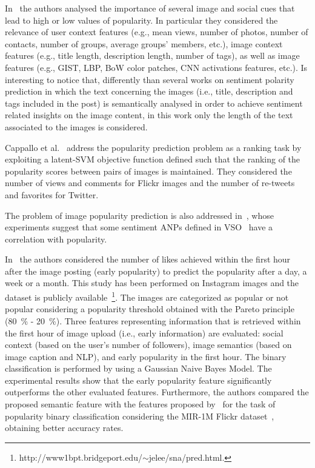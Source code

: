 In~\cite{khosla2014makes} the authors analysed the importance of several image and social cues that lead to high or low values of popularity. In particular they considered the relevance of user context features (e.g., mean views, number of photos, number of contacts, number of groups, average groups' members, etc.), image context features (e.g., title length, description length, number of tags), as well as image features (e.g., GIST, LBP, BoW color patches, CNN activations features, etc.). Is interesting to notice that, differently than several works on sentiment polarity prediction in which the text concerning the images (i.e., title, description and tags included in the post) is semantically analysed in order to achieve sentiment related insights on the image content, in this work only the length of the text associated to the images is considered. 

Cappallo et al.~\cite{cappallo2015latent} address the popularity prediction problem as a ranking task by exploiting a latent-SVM objective function defined such that the ranking of the popularity scores between pairs of images is maintained.
They considered the number of views and comments for Flickr images and the number of re-tweets and favorites for Twitter.

The problem of image popularity prediction is also addressed in~\cite{gelli2015image}, whose experiments suggest that some sentiment ANPs defined in VSO~\cite{borth2013large} have a correlation with popularity.

In~\cite{almgren2016predicting} the authors considered the number of likes achieved within the first hour after the image posting (early popularity) to predict the popularity after a day, a week or a month. This study has been performed on Instagram images and the dataset is publicly available~\footnote{http://www1bpt.bridgeport.edu/$\sim$jelee/sna/pred.html.}. The images are categorized as popular or not popular considering a popularity threshold obtained with the Pareto principle (80~\% - 20~\%). Three features representing information that is retrieved within the first hour of image upload (i.e., early information) are evaluated: social context (based on the user's number of followers), image semantics (based on image caption and NLP), and early popularity in the first hour. The binary classification is performed by using a Gaussian Naive Bayes Model. The experimental results show that the early popularity feature significantly outperforms the other evaluated features. Furthermore, the authors compared the proposed semantic feature with the features proposed by~\cite{mcparlane2014nobody} for the task of popularity binary classification considering the MIR-1M Flickr dataset~\cite{huiskes2010new}, obtaining better accuracy rates.

